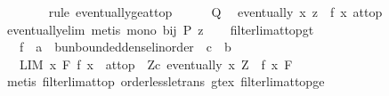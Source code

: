 \begin{isabellebody}
\ \ \ \ \ \ \isamarkupfalse%
\ {\isacharparenleft}{\kern0pt}rule\ eventually{\isacharunderscore}{\kern0pt}ge{\isacharunderscore}{\kern0pt}at{\isacharunderscore}{\kern0pt}top{\isacharparenright}{\kern0pt}\isanewline
\ \ \ \ \isamarkupfalse%
\ Q\ \isamarkupfalse%
\ {\isachardoublequoteopen}eventually\ {\isacharparenleft}{\kern0pt}{\isasymlambda}x{\isachardot}{\kern0pt}\ z\ {\isasymle}\ f\ x{\isacharparenright}{\kern0pt}\ at{\isacharunderscore}{\kern0pt}top{\isachardoublequoteclose}\isanewline
\ \ \ \ \ \ \isamarkupfalse%
\ eventually{\isacharunderscore}{\kern0pt}elim\ {\isacharparenleft}{\kern0pt}metis\ mono\ bij\ {\isacartoucheopen}P\ z{\isacartoucheclose}{\isacharparenright}{\kern0pt}\isanewline
\ \ \isamarkupfalse%
\isanewline
{}\isamarkupfalse%
%
\endisatagproof
{\isafoldproof}%
%
\isadelimproof
\isanewline
%
\endisadelimproof
\isanewline
{}\isamarkupfalse%
\ filterlim{\isacharunderscore}{\kern0pt}at{\isacharunderscore}{\kern0pt}top{\isacharunderscore}{\kern0pt}gt{\isacharcolon}{\kern0pt}\isanewline
\ \ \ f\ {\isacharcolon}{\kern0pt}{\isacharcolon}{\kern0pt}\ {\isachardoublequoteopen}{\isacharprime}{\kern0pt}a\ {\isasymRightarrow}\ {\isacharparenleft}{\kern0pt}{\isacharprime}{\kern0pt}b{\isacharcolon}{\kern0pt}{\isacharcolon}{\kern0pt}unbounded{\isacharunderscore}{\kern0pt}dense{\isacharunderscore}{\kern0pt}linorder{\isacharparenright}{\kern0pt}{\isachardoublequoteclose}\ \ c\ {\isacharcolon}{\kern0pt}{\isacharcolon}{\kern0pt}\ {\isachardoublequoteopen}{\isacharprime}{\kern0pt}b{\isachardoublequoteclose}\isanewline
\ \ \ {\isachardoublequoteopen}{\isacharparenleft}{\kern0pt}LIM\ x\ F{\isachardot}{\kern0pt}\ f\ x\ {\isacharcolon}{\kern0pt}{\isachargreater}{\kern0pt}\ at{\isacharunderscore}{\kern0pt}top{\isacharparenright}{\kern0pt}\ {\isasymlongleftrightarrow}\ {\isacharparenleft}{\kern0pt}{\isasymforall}Z{\isachargreater}{\kern0pt}c{\isachardot}{\kern0pt}\ eventually\ {\isacharparenleft}{\kern0pt}{\isasymlambda}x{\isachardot}{\kern0pt}\ Z\ {\isasymle}\ f\ x{\isacharparenright}{\kern0pt}\ F{\isacharparenright}{\kern0pt}{\isachardoublequoteclose}\isanewline
%
\isadelimproof
\ \ %
\endisadelimproof
%
\isatagproof
{}\isamarkupfalse%
\ {\isacharparenleft}{\kern0pt}metis\ filterlim{\isacharunderscore}{\kern0pt}at{\isacharunderscore}{\kern0pt}top\ order{\isacharunderscore}{\kern0pt}less{\isacharunderscore}{\kern0pt}le{\isacharunderscore}{\kern0pt}trans\ gt{\isacharunderscore}{\kern0pt}ex\ filterlim{\isacharunderscore}{\kern0pt}at{\isacharunderscore}{\kern0pt}top{\isacharunderscore}{\kern0pt}ge{\isacharparenright}{\kern0pt}%

\end{isabellebody}
